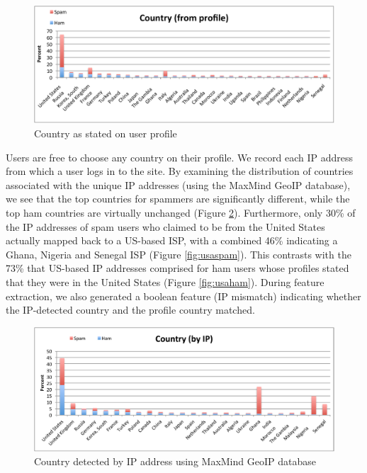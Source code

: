 \documentclass[preprint]{acm_proc_article-sp}
\begin{document}
\begin{figure}[h]
    \centering
    \includegraphics[width=\linewidth]{figures/country-prof.pdf}
    \caption{Country as stated on user profile}
    \label{fig:cprof}
\end{figure}

Users are free to choose any country on their profile. We record each IP address from which a 
user logs in to the site. By examining the distribution of countries  associated with the unique IP addresses
(using the MaxMind GeoIP database\cite{maxmind}), we see that the top 
countries for spammers are significantly different, while the top ham countries are 
virtually unchanged (Figure \ref{fig:cip}). Furthermore, only 30\% of the IP addresses of spam users who 
claimed to be from the United States actually mapped back to a US-based ISP, with a combined 
46\% indicating a Ghana, Nigeria and Senegal ISP (Figure \ref{fig:usaspam}). This contrasts 
with the 73\% that US-based IP addresses comprised for ham users whose profiles stated that 
they were in the United States (Figure \ref{fig:usaham}). During feature extraction, we also 
generated a boolean feature (IP mismatch) indicating whether the IP-detected country and 
the profile country matched. 

\begin{figure}[h]
    \centering
    \includegraphics[width=\linewidth]{figures/country-ip.pdf}
    \caption{Country detected by IP address using MaxMind GeoIP database}
    \label{fig:cip}
\end{figure}
\end{document}
